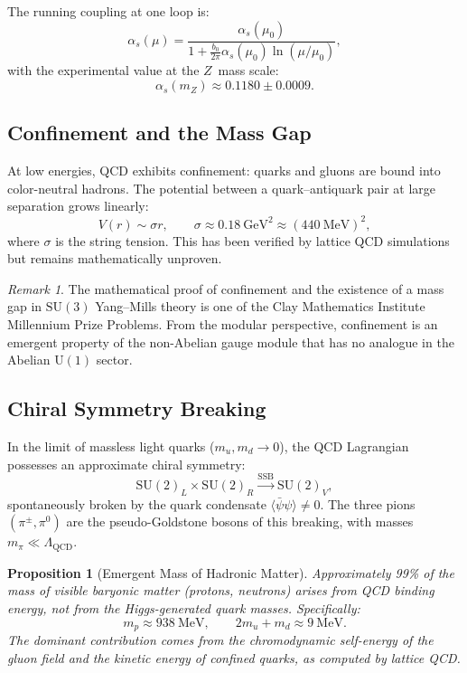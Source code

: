 \documentclass[12pt]{article}
\newtheorem{proposition}[theorem]{Proposition}
\theoremstyle{definition}
\theoremstyle{remark}
\newtheorem{remark}[theorem]{Remark}
\newcommand{\su}[1]{\mathrm{SU}(#1)}
\newcommand{\uu}[1]{\mathrm{U}(#1)}
\newcommand{\vev}[1]{\langle #1 \rangle}
\begin{document}
The running coupling at one loop is:
\begin{equation}
\label{eq:running-alphas}
\alpha_s(\mu) = \frac{\alpha_s(\mu_0)}{1 + \frac{b_0}{2\pi} \alpha_s(\mu_0) \ln(\mu/\mu_0)},
\end{equation}
with the experimental value at the $Z$~mass scale:
\begin{equation}
\alpha_s(m_Z) \approx 0.1180 \pm 0.0009.
\end{equation}

\subsection{Confinement and the Mass Gap}

At low energies, QCD exhibits confinement: quarks and gluons are bound into color-neutral hadrons. The potential between a quark--antiquark pair at large separation grows linearly:
\begin{equation}
\label{eq:linear-potential}
V(r) \sim \sigma r, \qquad \sigma \approx 0.18~\text{GeV}^2 \approx (440~\text{MeV})^2,
\end{equation}
where $\sigma$ is the string tension. This has been verified by lattice QCD simulations but remains mathematically unproven.

\begin{remark}
The mathematical proof of confinement and the existence of a mass gap in $\su{3}$ Yang--Mills theory is one of the Clay Mathematics Institute Millennium Prize Problems. From the modular perspective, confinement is an emergent property of the non-Abelian gauge module that has no analogue in the Abelian $\uu{1}$ sector.
\end{remark}

\subsection{Chiral Symmetry Breaking}

In the limit of massless light quarks ($m_u, m_d \to 0$), the QCD Lagrangian possesses an approximate chiral symmetry:
\begin{equation}
\su{2}_L \times \su{2}_R \xrightarrow{\text{SSB}} \su{2}_V,
\end{equation}
spontaneously broken by the quark condensate $\vev{\bar{\psi}\psi} \neq 0$. The three pions $(\pi^\pm, \pi^0)$ are the pseudo-Goldstone bosons of this breaking, with masses $m_\pi \ll \Lambda_{\mathrm{QCD}}$.

\begin{proposition}[Emergent Mass of Hadronic Matter]
\label{prop:hadron-mass}
Approximately 99\% of the mass of visible baryonic matter (protons, neutrons) arises from QCD binding energy, not from the Higgs-generated quark masses. Specifically:
\begin{equation}
m_p \approx 938~\text{MeV}, \qquad 2m_u + m_d \approx 9~\text{MeV}.
\end{equation}
The dominant contribution comes from the chromodynamic self-energy of the gluon field and the kinetic energy of confined quarks, as computed by lattice QCD.
\end{proposition}
\end{document}
